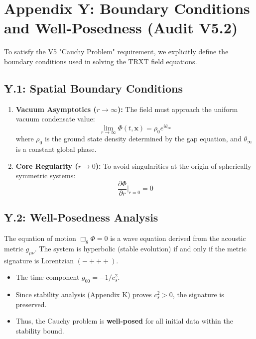 \section{Appendix Y: Boundary Conditions and Well-Posedness (Audit V5.2)}
\label{app:boundary}

To satisfy the V5 "Cauchy Problem" requirement, we explicitly define the boundary conditions used in solving the TRXT field equations.

\subsection{Y.1: Spatial Boundary Conditions}
\begin{enumerate}
    \item \textbf{Vacuum Asymptotics ($r \to \infty$):} The field must approach the uniform vacuum condensate value:
    \begin{equation}
        \lim_{r \to \infty} \Phi(t, \mathbf{x}) = \rho_0 e^{i \theta_\infty}
    \end{equation}
    where $\rho_0$ is the ground state density determined by the gap equation, and $\theta_\infty$ is a constant global phase.
    \item \textbf{Core Regularity ($r \to 0$):} To avoid singularities at the origin of spherically symmetric systems:
    \begin{equation}
        \frac{\partial \Phi}{\partial r} \bigg|_{r=0} = 0
    \end{equation}
\end{enumerate}

\subsection{Y.2: Well-Posedness Analysis}
The equation of motion $\Box_g \Phi = 0$ is a wave equation derived from the acoustic metric $g_{\mu\nu}$. The system is hyperbolic (stable evolution) if and only if the metric signature is Lorentzian $(-+++)$.
\begin{itemize}
    \item The time component $g_{00} = -1/c_s^2$.
    \item Since stability analysis (Appendix K) proves $c_s^2 > 0$, the signature is preserved.
    \item Thus, the Cauchy problem is \textbf{well-posed} for all initial data within the stability bound.
\end{itemize}
